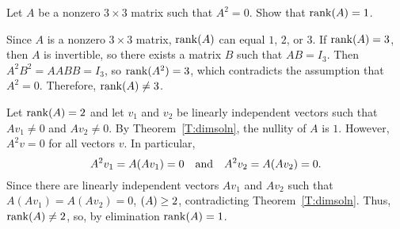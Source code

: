 \documentclass{ximera}
\begin{document}
\begin{exercise} \label{c5.8.4}
Let $A$ be a nonzero $3\times 3$ matrix such that $A^2=0$.  Show that
${\rm rank}(A)=1$.

\begin{solution}

Since $A$ is a nonzero $3 \times 3$ matrix, ${\rm rank}(A)$ can equal $1$,
$2$, or $3$.  If ${\rm rank}(A) = 3$, then $A$ is invertible, so there
exists a matrix $B$ such that $AB = I_3$.  Then $A^2B^2 = AABB = I_3$,
so ${\rm rank}(A^2) = 3$, which contradicts the assumption that $A^2 = 0$.
Therefore, ${\rm rank}(A) \neq 3$.

\para Let ${\rm rank}(A) = 2$ and let $v_1$ and $v_2$ be linearly independent
vectors such that $Av_1 \neq 0$ and $Av_2 \neq 0$.  By
Theorem~\ref{T:dimsoln}, the nullity of $A$ is $1$.  However,
$A^2v = 0$ for all vectors $v$.  In particular,
\[
A^2v_1 = A(Av_1) = 0 \quad\mbox{and}\quad A^2v_2 = A(Av_2) = 0.
\]
Since there are linearly independent vectors $Av_1$ and $Av_2$ such
that $A(Av_1) = A(Av_2) = 0$, $\null(A) \geq 2$, contradicting
Theorem~\ref{T:dimsoln}.  Thus, ${\rm rank}(A) \neq 2$, so, by elimination
${\rm rank}(A) = 1$.

\end{solution}
\end{exercise}
\end{document}
